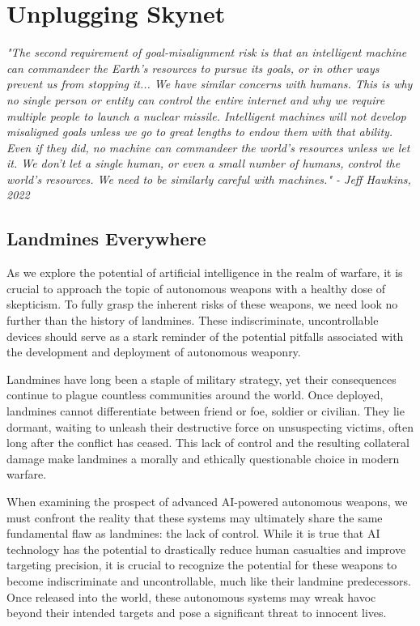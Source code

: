 \setchapterpreamble[u]{\margintoc}
\chapter{Unplugging Skynet}

\textit{"The second requirement of goal-misalignment risk is that an intelligent machine can commandeer the Earth's resources to pursue its goals, or in other ways prevent us from stopping it... We have similar concerns with humans. This is why no single person or entity can control the entire internet and why we require multiple people to launch a nuclear missile. Intelligent machines will not develop misaligned goals unless we go to great lengths to endow them with that ability. Even if they did, no machine can commandeer the world's resources unless we let it. We don't let a single human, or even a small number of humans, control the world's resources. We need to be similarly careful with machines." - Jeff Hawkins, 2022 \cite{hawkins2022}}

\section{Landmines Everywhere}

As we explore the potential of artificial intelligence in the realm of warfare, it is crucial to approach the topic of autonomous weapons with a healthy dose of skepticism. To fully grasp the inherent risks of these weapons, we need look no further than the history of landmines. These indiscriminate, uncontrollable devices should serve as a stark reminder of the potential pitfalls associated with the development and deployment of autonomous weaponry.

Landmines have long been a staple of military strategy, yet their consequences continue to plague countless communities around the world. Once deployed, landmines cannot differentiate between friend or foe, soldier or civilian. They lie dormant, waiting to unleash their destructive force on unsuspecting victims, often long after the conflict has ceased. This lack of control and the resulting collateral damage make landmines a morally and ethically questionable choice in modern warfare.

When examining the prospect of advanced AI-powered autonomous weapons, we must confront the reality that these systems may ultimately share the same fundamental flaw as landmines: the lack of control. While it is true that AI technology has the potential to drastically reduce human casualties and improve targeting precision, it is crucial to recognize the potential for these weapons to become indiscriminate and uncontrollable, much like their landmine predecessors. Once released into the world, these autonomous systems may wreak havoc beyond their intended targets and pose a significant threat to innocent lives.

